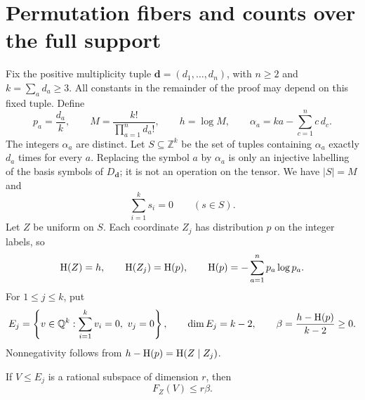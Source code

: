 \section{Permutation fibers and counts over the full support}
\label{sec:fibers}

Fix the positive multiplicity tuple $\mathbf d=(d_1,\ldots,d_n)$, with
$n\geq 2$ and $k=\sum_a d_a\geq 3$.  All constants in the remainder of
the proof may depend on this fixed tuple.  Define
\begin{equation}
  p_a=\frac{d_a}{k},\qquad
  M=\frac{k!}{\prod_{a=1}^n d_a!},\qquad
  h=\log M,\qquad
  \alpha_a=ka-\sum_{c=1}^n c\,d_c.
  \label{eq:support-parameters}
\end{equation}
The integers $\alpha_a$ are distinct.  Let $S\subseteq\mathbb Z^k$ be
the set of tuples containing $\alpha_a$ exactly $d_a$ times for every
$a$.  Replacing the symbol $a$ by $\alpha_a$ is only an injective
labelling of the basis symbols of $D_{\mathbf d}$; it is not an operation
on the tensor.  We have $|S|=M$ and
\[
  \sum_{i=1}^k s_i=0\qquad(s\in S).
\]
Let $Z$ be uniform on $S$.  Each coordinate $Z_j$ has distribution $p$
on the integer labels, so
\[
  \operatorname{H}(Z)=h,\qquad \operatorname{H}(Z_j)=\operatorname{H}(p),\qquad
  \operatorname{H}(p)=-\sum_{a=1}^n p_a\log p_a.
\]
For $1\leq j\leq k$, put
\begin{equation}
  E_j=\left\{v\in\mathbb Q^k:
           \sum_{i=1}^k v_i=0,\ v_j=0\right\},
  \qquad \dim E_j=k-2,
  \qquad \beta=\frac{h-\operatorname{H}(p)}{k-2}\geq 0.
  \label{eq:collision-space}
\end{equation}
Nonnegativity follows from $h-\operatorname{H}(p)=\operatorname{H}(Z\mid Z_j)$.

\begin{lemma}
\label{lem:fiber-entropy}
If $V\leq E_j$ is a rational subspace of dimension $r$, then
\begin{equation}
  F_Z(V)\leq r\beta.
  \label{eq:fiber-entropy-bound}
\end{equation}
\end{lemma}

